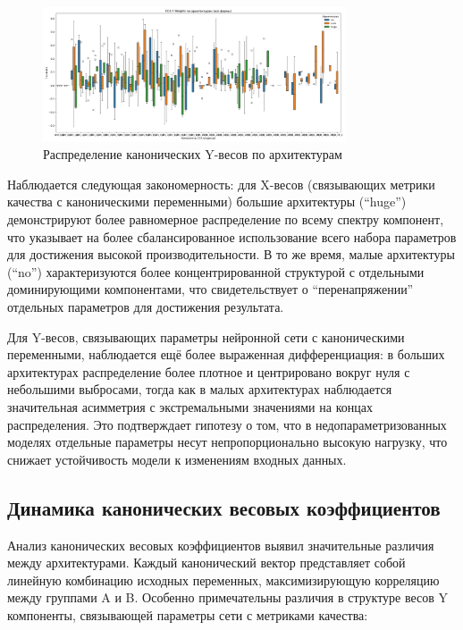 \documentclass[a4paper,12pt]{article}
\begin{document}
\begin{figure}[ht]
  \centering
  \includegraphics[width=0.8\textwidth]{resources/cca_y_weights_all_shapes.pdf}
  \caption{Распределение канонических Y-весов по архитектурам}
  \label{fig:cca_y_weights}
\end{figure}

Наблюдается следующая закономерность: для X-весов (связывающих метрики качества с каноническими переменными)
большие архитектуры (``huge'') демонстрируют более равномерное распределение по всему спектру компонент, что
указывает на более сбалансированное использование всего набора параметров для достижения высокой
производительности. В то же время, малые архитектуры (``no'') характеризуются более концентрированной
структурой с отдельными доминирующими компонентами, что свидетельствует о ``перенапряжении'' отдельных
параметров для достижения результата.

Для Y-весов, связывающих параметры нейронной сети с каноническими переменными, наблюдается ещё более
выраженная дифференциация: в больших архитектурах распределение более плотное и центрировано вокруг нуля с
небольшими выбросами, тогда как в малых архитектурах наблюдается значительная асимметрия с экстремальными
значениями на концах распределения. Это подтверждает гипотезу о том, что в недопараметризованных моделях
отдельные параметры несут непропорционально высокую нагрузку, что снижает устойчивость модели к изменениям
входных данных.

\subsection{Динамика канонических весовых коэффициентов}

Анализ канонических весовых коэффициентов выявил значительные различия между архитектурами. Каждый
канонический вектор представляет собой линейную комбинацию исходных переменных, максимизирующую корреляцию
между группами A и B. Особенно примечательны различия в структуре весов Y компоненты, связывающей параметры
сети с метриками качества:
\end{document}

